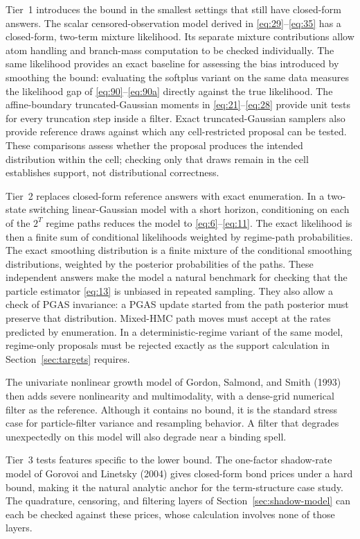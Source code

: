 \documentclass[11pt]{article}
\begin{document}
Tier~1 introduces the bound in the smallest settings that still have closed-form answers. The scalar censored-observation model derived in \eqref{eq:29}--\eqref{eq:35} has a closed-form, two-term mixture likelihood. Its separate mixture contributions allow atom handling and branch-mass computation to be checked individually. The same likelihood provides an exact baseline for assessing the bias introduced by smoothing the bound: evaluating the softplus variant on the same data measures the likelihood gap of \eqref{eq:90}--\eqref{eq:90a} directly against the true likelihood. The affine-boundary truncated-Gaussian moments in \eqref{eq:21}--\eqref{eq:28} provide unit tests for every truncation step inside a filter. Exact truncated-Gaussian samplers also provide reference draws against which any cell-restricted proposal can be tested. These comparisons assess whether the proposal produces the intended distribution within the cell; checking only that draws remain in the cell establishes support, not distributional correctness.

Tier~2 replaces closed-form reference answers with exact enumeration. In a two-state switching linear-Gaussian model with a short horizon, conditioning on each of the $2^{T}$ regime paths reduces the model to \eqref{eq:6}--\eqref{eq:11}. The exact likelihood is then a finite sum of conditional likelihoods weighted by regime-path probabilities. The exact smoothing distribution is a finite mixture of the conditional smoothing distributions, weighted by the posterior probabilities of the paths. These independent answers make the model a natural benchmark for checking that the particle estimator \eqref{eq:13} is unbiased in repeated sampling. They also allow a check of PGAS invariance: a PGAS update started from the path posterior must preserve that distribution. Mixed-HMC path moves must accept at the rates predicted by enumeration. In a deterministic-regime variant of the same model, regime-only proposals must be rejected exactly as the support calculation in Section~\ref{sec:targets} requires.

The univariate nonlinear growth model of Gordon, Salmond, and Smith (1993) then adds severe nonlinearity and multimodality, with a dense-grid numerical filter as the reference. Although it contains no bound, it is the standard stress case for particle-filter variance and resampling behavior. A filter that degrades unexpectedly on this model will also degrade near a binding spell.

Tier~3 tests features specific to the lower bound. The one-factor shadow-rate model of Gorovoi and Linetsky (2004) gives closed-form bond prices under a hard bound, making it the natural analytic anchor for the term-structure case study. The quadrature, censoring, and filtering layers of Section~\ref{sec:shadow-model} can each be checked against these prices, whose calculation involves none of those layers.
\end{document}
